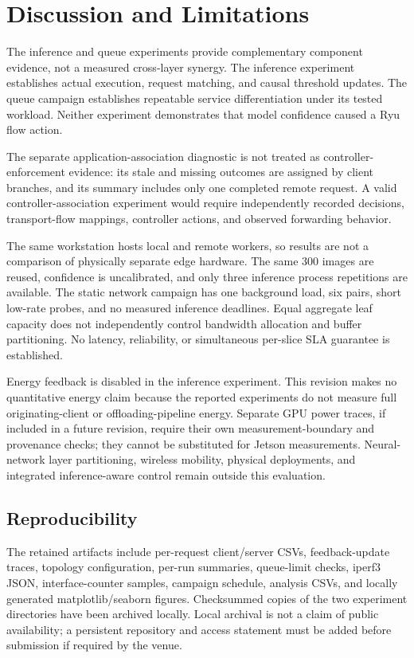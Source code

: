 \documentclass[journal]{IEEEtran}
\begin{document}
\section{Discussion and Limitations}
\label{sec:discussion}
The inference and queue experiments provide complementary component evidence, not a measured cross-layer synergy. The inference experiment establishes actual execution, request matching, and causal threshold updates. The queue campaign establishes repeatable service differentiation under its tested workload. Neither experiment demonstrates that model confidence caused a Ryu flow action.

The separate application-association diagnostic is not treated as controller-enforcement evidence: its stale and missing outcomes are assigned by client branches, and its summary includes only one completed remote request. A valid controller-association experiment would require independently recorded decisions, transport-flow mappings, controller actions, and observed forwarding behavior.

The same workstation hosts local and remote workers, so results are not a comparison of physically separate edge hardware. The same 300 images are reused, confidence is uncalibrated, and only three inference process repetitions are available. The static network campaign has one background load, six pairs, short low-rate probes, and no measured inference deadlines. Equal aggregate leaf capacity does not independently control bandwidth allocation and buffer partitioning. No latency, reliability, or simultaneous per-slice SLA guarantee is established.

Energy feedback is disabled in the inference experiment. This revision makes no quantitative energy claim because the reported experiments do not measure full originating-client or offloading-pipeline energy. Separate GPU power traces, if included in a future revision, require their own measurement-boundary and provenance checks; they cannot be substituted for Jetson measurements. Neural-network layer partitioning, wireless mobility, physical deployments, and integrated inference-aware control remain outside this evaluation.

\subsection{Reproducibility}
The retained artifacts include per-request client/server CSVs, feedback-update traces, topology configuration, per-run summaries, queue-limit checks, iperf3 JSON, interface-counter samples, campaign schedule, analysis CSVs, and locally generated matplotlib/seaborn figures. Checksummed copies of the two experiment directories have been archived locally. Local archival is not a claim of public availability; a persistent repository and access statement must be added before submission if required by the venue.
\end{document}
